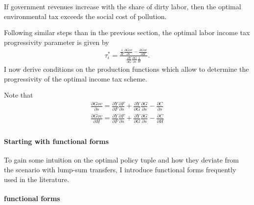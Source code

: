 If government revenues increase with the share of dirty labor, then the optimal environmental tax exceeds the social cost of pollution. 

Following similar steps than in the previous section, the optimal labor income tax progressivity parameter is given by 
\begin{align}
\tau_\iota^*=\frac{\frac{s}{H}\frac{\partial Gov}{\partial s}- \frac{\partial Gov}{\partial H}}{\frac{\partial Y}{\partial G}\frac{\partial G}{\partial s}\frac{1}{H}}.
\end{align}
 I now derive conditions on the production functions which allow to determine the progressivity of the optimal income tax scheme. 
 
 
 Note that
 \begin{align}
\frac{\partial Gov}{\partial s}=\frac{\partial Y}{\partial F}\frac{\partial F}{\partial s}+\frac{\partial Y}{\partial G}\frac{\partial G}{\partial s}-\frac{\partial C}{\partial s}\\
\frac{\partial Gov}{\partial H}=\frac{\partial Y}{\partial F}\frac{\partial F}{\partial s}+\frac{\partial Y}{\partial G}\frac{\partial G}{\partial s}-\frac{\partial C}{\partial H}\\
 \end{align}


\paragraph{Starting with functional forms}
To gain some intuition on the optimal policy tuple and how they deviate from the scenario with lump-sum transfers,  I introduce functional forms frequently used in the literature.  

\paragraph{functional forms}

